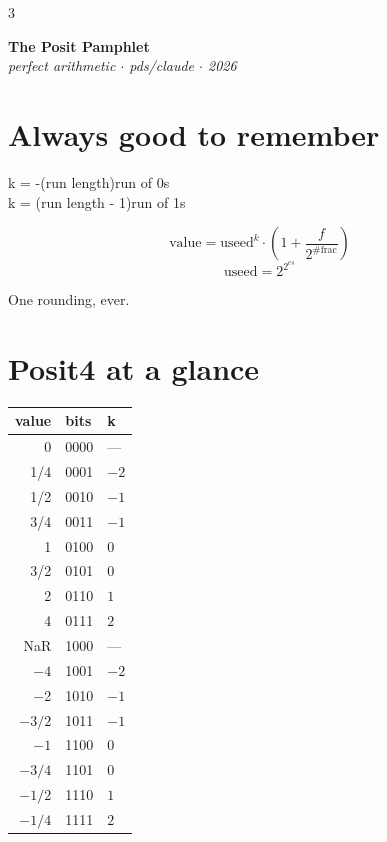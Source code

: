 \documentclass[10pt]{article}
\begin{document}
\begin{multicols}{3}

\begin{center}
  {\Large\bfseries The Posit Pamphlet}\\[3pt]
  {\small\itshape perfect arithmetic $\cdot$ pds/claude $\cdot$ 2026}
\end{center}

\section*{Always good to remember}

\smallskip
{\small\ttfamily\noindent\hspace{0.5em}%
k = -(run length)\hfill run of 0s\\[1pt]
\hspace{0.5em}k = \phantom{-(}(run length - 1)\hfill run of 1s}

\vspace{4pt}
{\large
\[
  \text{value} = \text{useed}^k \cdot \left(1 + \frac{f}{2^{\#\text{frac}}}\right)
\]}
\vspace{-10pt}
\[
  \text{useed} = 2^{2^{es}}
\]
\vspace{-6pt}

\noindent\small One rounding, ever.

\section*{Posit4 at a glance}

\begin{center}
\small
\begin{tabular}{rll}
\toprule
value & bits & k \\
\midrule
  0   & 0000 & --- \\
 1/4  & 0001 & $-2$ \\
 1/2  & 0010 & $-1$ \\
 3/4  & 0011 & $-1$ \\
  1   & 0100 &  $0$ \\
 3/2  & 0101 &  $0$ \\
  2   & 0110 &  $1$ \\
  4   & 0111 &  $2$ \\
 NaR  & 1000 & --- \\
 $-4$ & 1001 & $-2$ \\
$-$2  & 1010 & $-1$ \\
$-3/2$& 1011 & $-1$ \\
$-1$  & 1100 &  $0$ \\
$-3/4$& 1101 &  $0$ \\
$-1/2$& 1110 &  $1$ \\
$-1/4$& 1111 &  $2$ \\
\bottomrule
\end{tabular}
\end{center}


\end{multicols}
\end{document}
